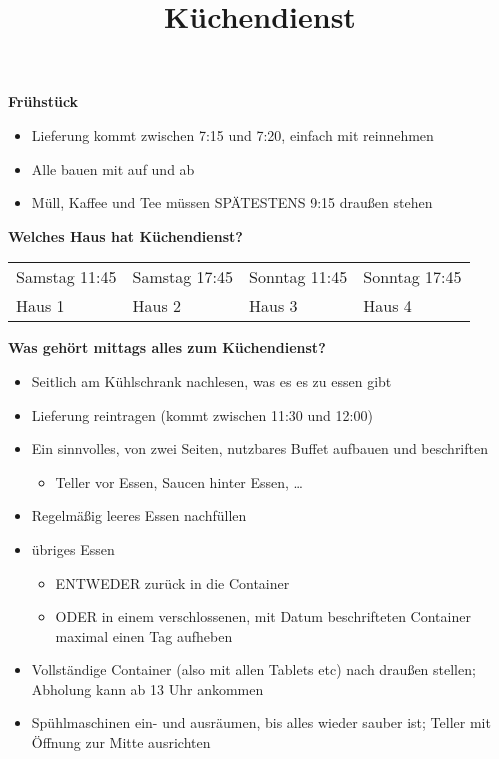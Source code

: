 \documentclass[showtrims, a4paper]{article}
\title{Küchendienst}
\date{}
\begin{document}
\maketitle{}

\begin{center}
\textbf{Frühstück}
\begin{itemize}
 \item Lieferung kommt zwischen 7:15 und 7:20, einfach mit reinnehmen
 \item Alle bauen mit auf und ab
 \item Müll, Kaffee und Tee müssen SPÄTESTENS 9:15 draußen stehen
\end{itemize}
\end{center}

\vspace{0.0cm}
\begin{center}
\textbf{Welches Haus hat Küchendienst?}

\vspace{0.1cm}
\begin{tabular}{l|l|l|l}
 Samstag 11:45 & Samstag 17:45 & Sonntag 11:45 & Sonntag 17:45 \\
 Haus 1 & Haus 2 & Haus 3 & Haus 4
\end{tabular}
\end{center}

\vspace{0.0cm}
\begin{center}
\textbf{Was gehört mittags alles zum Küchendienst?}
\begin{itemize}
 \item Seitlich am Kühlschrank nachlesen, was es es zu essen gibt
 \item Lieferung reintragen (kommt zwischen 11:30 und 12:00)
 \item Ein sinnvolles, von zwei Seiten, nutzbares Buffet aufbauen und beschriften
 \begin{itemize}
   \item Teller vor Essen, Saucen hinter Essen, \dots
 \end{itemize}
 \item Regelmäßig leeres Essen nachfüllen
 \item übriges Essen
   \begin{itemize}
     \item ENTWEDER zurück in die Container
     \item ODER in einem verschlossenen, mit Datum beschrifteten Container maximal einen Tag aufheben
   \end{itemize}
  \item Vollständige Container (also mit allen Tablets etc) nach draußen stellen;
    Abholung kann ab 13 Uhr ankommen
 \item Spühlmaschinen ein- und ausräumen, bis alles wieder sauber ist; Teller mit Öffnung zur Mitte ausrichten
\end{itemize}
\end{center}
\end{document}
